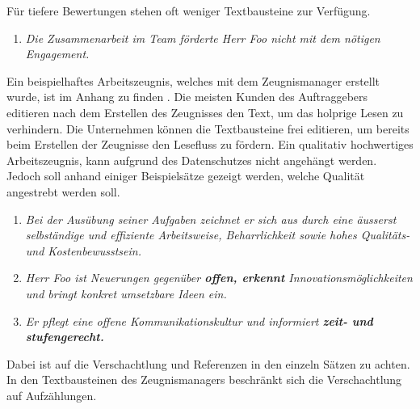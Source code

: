 Für tiefere Bewertungen stehen oft weniger Textbausteine zur Verfügung.
\begin{enumerate}
	\setlength\itemsep{0em}
	\item \textit{Die Zusammenarbeit im Team förderte Herr Foo nicht mit dem nötigen Engagement.}
\end{enumerate}
\noindent
Ein beispielhaftes Arbeitszeugnis, welches mit dem Zeugnismanager erstellt wurde, ist im Anhang zu finden
. Die meisten Kunden des Auftraggebers editieren nach dem Erstellen des Zeugnisses
den Text, um das holprige Lesen zu verhindern. Die Unternehmen können die Textbausteine frei editieren, um bereits beim
Erstellen der Zeugnisse den Lesefluss zu fördern. Ein qualitativ hochwertiges Arbeitszeugnis, kann aufgrund des
Datenschutzes nicht angehängt werden. Jedoch soll anhand einiger Beispielsätze gezeigt werden, welche Qualität
angestrebt werden soll.
\begin{enumerate}
	\setlength\itemsep{0em}
	\item \textit{Bei der Ausübung seiner Aufgaben zeichnet er sich aus durch eine äusserst selbständige und effiziente Arbeitsweise, Beharrlichkeit sowie hohes Qualitäts- und Kostenbewusstsein.}
	\item \textit{Herr Foo ist Neuerungen gegenüber \textbf{offen, erkennt} Innovationsmöglichkeiten und bringt konkret umsetzbare Ideen ein.}
	\item \textit{Er pflegt eine offene Kommunikationskultur und informiert \textbf{zeit- und stufengerecht.}}
\end{enumerate}
\noindent
Dabei ist auf die Verschachtlung und Referenzen in den einzeln Sätzen zu achten. In den Textbausteinen des
Zeugnismanagers beschränkt sich die Verschachtlung auf Aufzählungen.

